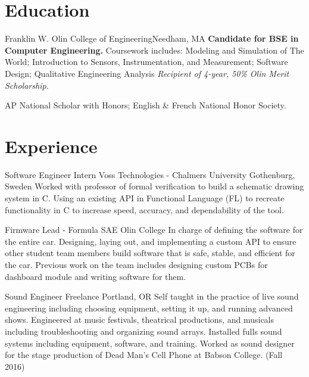 \documentclass[11 pt]{moderncv}
\begin{document}
\maketitle

\vspace{-.6in}

\section{Education}

{Franklin W. Olin College of Engineering}{}{Needham, MA}{}
{
	\textbf{Candidate for BSE in Computer Engineering.}
	  Coursework includes:
    Modeling and Simulation of The World;
    Introduction to Sensors, Instrumentation, and Measurement;
    Software Design;
    Qualitative Engineering Analysis
	\newline
	\textit{Recipient of 4-year, 50\% Olin Merit Scholarship.}
}

{
	AP National Scholar with Honors; English \& French National Honor Society.
	\begin{flushright}
	\vspace {-0.3 in}
	\end{flushright}
	\vspace {-0.1 in}
}

\section{Experience}
\vspace{0.06 in}

{Software Engineer Intern}
{Voss Technologies - Chalmers University}
{Gothenburg, Sweden}
{}
{Worked with professor of formal verification to build a schematic drawing system in C. Using an existing API in Functional Language (FL) to recreate functionality in C to increase speed, accuracy, and dependability of the tool.}

{Firmware Lead - Formula SAE}
{Olin College}
{}
{}
{In charge of defining the software for the entire car. Designing, laying out, and implementing a custom API to ensure other student team members build software that is safe, stable, and efficient for the car. Previous work on the team includes designing custom PCBs for dashboard module and writing software for them.}

{Sound Engineer}
{Freelance}
{Portland, OR}
{}
{Self taught in the practice of live sound engineering including choosing equipment, setting it up, and running advanced shows. Engineered at music festivals, theatrical productions, and musicals including troubleshooting and organizing sound arrays. Installed fulls sound systems including equipment, software, and training. Worked as sound designer for the stage production of Dead Man's Cell Phone at Babson College. (Fall 2016)}
\end{document}

